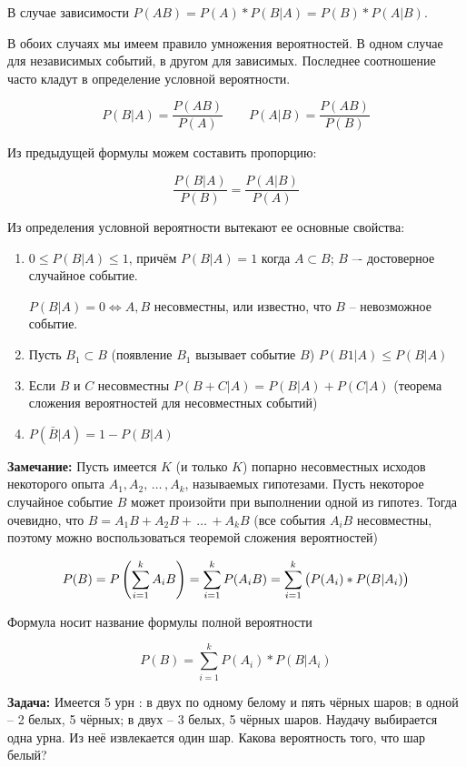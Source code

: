 \documentclass[a4paper,12pt]{report}
\newcommand*{\task}[1]{\rule{0pt}{10mm}\textbf{#1}}
\newcommand*{\comm}[1]{\rule{0pt}{10mm}\textbf{#1}}
\newcommand{\sudots}{\,\ldots\,}
\begin{document}
	В случае зависимости $P(AB) = P(A)*P(B|A) = P(B)*P(A|B)$. 

	В обоих случаях мы имеем правило умножения вероятностей. В одном случае для независимых событий, в другом для зависимых. Последнее соотношение часто кладут в определение условной вероятности. 

	$$
	  P(B|A) = \frac{P(AB)}{P(A)} \qquad 
	  P(A|B) = \frac{P(AB)}{P(B)}
	$$

	Из предыдущей формулы можем составить пропорцию: 
	
	$$
	  \frac{P(B|A)}{P(B)} = \frac{P(A|B)}{P(A)}
	$$

	Из определения условной вероятности вытекают ее основные свойства:


	\begin{enumerate}

	\item	$0 \leqslant P(B|A) \leqslant 1$, причём $P(B|A) = 1$ когда $A \subset B$; $B$ –- достоверное случайное событие.

		$P(B|A) = 0 \Longleftrightarrow A, B$ несовместны, или известно, что $B$ – невозможное событие.

	
	\item	Пусть $B_1 \subset B$ (появление $B_1$ вызывает событие $B$) $P(B1|A) \leqslant P(B|A)$


	\item	Если $B$ и $C$ несовместны $P(B+C|A) = P(B|A) + P(C|A)$ (теорема сложения вероятностей для несовместных событий)


	\item	$P(\bar B|A) =  1 - P(B|A)$

	\end{enumerate}


	\comm{Замечание:} Пусть имеется $K$ (и только $K$) попарно несовместных исходов некоторого опыта $A_1,A_2, \sudots ,A_k$, называемых гипотезами. Пусть некоторое случайное событие $B$ может произойти при выполнении одной из гипотез. Тогда очевидно, что $B = A_1B + A_2B + \sudots + A_kB$ (все события $A_iB$ несовместны, поэтому можно воспользоваться теоремой сложения вероятностей)

	$$
	  P(B) = P\left(\sum^k_{i=1}A_iB\right)
	       = \sum^k_{i=1}P(A_iB) 
	       = \sum^k_{i=1}\left(P(A_i)*P(B|A_i)\strut\right)
	$$

	Формула носит название формулы полной вероятности 

	$$
	  P(B) = \sum^k_{i=1}P(A_i)*P(B|A_i)
	$$

	
	\task{Задача: } Имеется 5 урн : в двух по одному белому и пять чёрных шаров; в одной – 2 белых, 5 чёрных; в двух – 3 белых, 5 чёрных шаров. Наудачу выбирается одна урна. Из неё извлекается один шар. Какова вероятность того, что шар белый?
\end{document}
